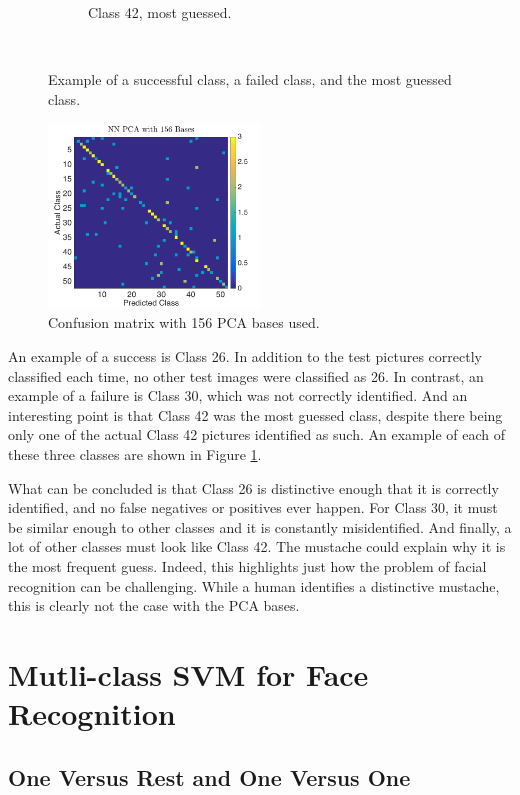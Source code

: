 \documentclass[a4paper, 10pt, conference]{ieeeconf}
\begin{document}
\begin{figure}[!ht]
\begin{subfigure}{0.125\textwidth}
          \caption{Class 42, most guessed.}
        \end{subfigure}
        ~
	\caption{Example of a successful class, a failed class, and the most guessed class. }
  \label{fig:classpics}
\end{figure}

\begin{figure}[!ht]
    \centering
    \includegraphics[width=0.5\textwidth]{src/confusepca.png}
    \caption{Confusion matrix with 156 PCA bases used.}
    \label{fig:confusepca}
\end{figure}

An example of a success is Class 26. In addition to the test pictures correctly classified each time, no other test images were classified as 26. In contrast, an example of a failure is Class 30, which was not correctly identified. And an interesting point is that Class 42 was the most guessed class, despite there being only one of the actual Class 42 pictures identified as such. An example of each of these three classes are shown in Figure \ref{fig:classpics}.

What can be concluded is that Class 26 is distinctive enough that it is correctly identified, and no false negatives or positives ever happen. For Class 30, it must be similar enough to other classes and it is constantly misidentified. And finally, a lot of other classes must look like Class 42. The mustache could explain why it is the most frequent guess. Indeed, this highlights just how the problem of facial recognition can be challenging. While a human identifies a distinctive mustache, this is clearly not the case with the PCA bases.

\section{Mutli-class SVM for Face Recognition}
\subsection{One Versus Rest and One Versus One}
\end{document}
